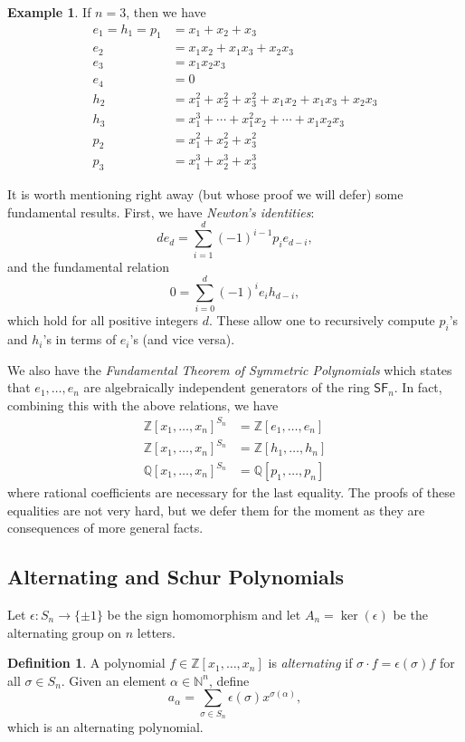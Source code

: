 \documentclass[12pt]{article}
\theoremstyle{plain}
\theoremstyle{definition}
\newtheorem{definition}[theorem]{Definition}
\newtheorem{example}[theorem]{Example}
\theoremstyle{remark}
\numberwithin{equation}{section}
\begin{document}
\begin{example}
If $n=3$, then we have
\begin{align*}
e_1 = h_1 = p_1 &= x_1 + x_2 + x_3\\
e_2 &= x_1x_2 + x_1x_3 + x_2x_3\\
e_3 &= x_1x_2x_3 \\
e_4 &= 0 \\
h_2 &= x_1^2 + x_2^2 + x_3^2 + x_1x_2 + x_1x_3 + x_2x_3\\
h_3 &= x_1^3 + \cdots + x_1^2x_2 + \cdots + x_1x_2x_3\\
p_2 &= x_1^2 + x_2^2 + x_3^2\\
p_3 &= x_1^3 + x_2^3 + x_3^3
\end{align*}
\end{example}

It is worth mentioning right away (but whose proof we will defer)
some fundamental results.  First, we have \emph{Newton's identities}:
\[
de_d = \sum_{i=1}^d (-1)^{i-1} p_i e_{d-i} ,
\]
and the fundamental relation
\[
0 = \sum_{i=0}^d (-1)^i e_i h_{d-i},
\]
which hold for all positive integers $d$.
These allow one to recursively compute $p_i$'s and $h_i$'s in terms
of $e_i$'s (and vice versa).

We also have the \emph{Fundamental Theorem of Symmetric
Polynomials} which states that $e_1,\ldots,e_n$ are algebraically independent
generators of the ring $\mathsf{SF}_n$.
In fact, combining this with the above relations, we have
\begin{align*}
\mathbb{Z}[x_1,\ldots,x_n]^{S_n} &= \mathbb{Z}[e_1,\ldots,e_n]\\
\mathbb{Z}[x_1,\ldots,x_n]^{S_n} &= \mathbb{Z}[h_1,\ldots,h_n]\\
\mathbb{Q}[x_1,\ldots,x_n]^{S_n} &= \mathbb{Q}[p_1,\ldots,p_n]
\end{align*}
where rational coefficients are necessary for the last equality.
The proofs of these equalities are not very hard, but we defer them for
the moment as they are consequences of more general facts.

\subsection{Alternating and Schur Polynomials}

Let $\epsilon : S_n \to \{\pm 1\}$ be the sign homomorphism
and let $A_n = \ker(\epsilon)$ be the alternating group on $n$ letters.

\begin{definition}
A polynomial $f \in \mathbb{Z}[x_1,\ldots,x_n]$ is \emph{alternating} if
$\sigma \cdot f = \epsilon(\sigma)f$ for all $\sigma \in S_n$.
Given an element $\alpha \in \mathbb{N}^n$, define
\[
a_\alpha = \sum_{\sigma \in S_n} \epsilon(\sigma) x^{\sigma(\alpha)},
\]
which is an alternating polynomial.
\end{definition}
\end{document}
